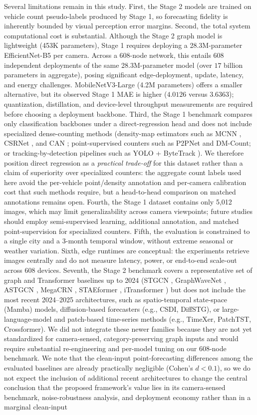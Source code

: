 \documentclass[a4paper,fleqn]{cas-sc}
\begin{document}
Several limitations remain in this study. First, the Stage 2 models are trained on vehicle count pseudo-labels produced by Stage 1, so forecasting fidelity is inherently bounded by visual perception error margins. Second, the total system computational cost is substantial. Although the Stage 2 graph model is lightweight (453K parameters), Stage 1 requires deploying a 28.3M-parameter EfficientNet-B5 per camera. Across a 608-node network, this entails 608 independent deployments of the same 28.3M-parameter model (over $17$ billion parameters in aggregate), posing significant edge-deployment, update, latency, and energy challenges. MobileNetV3-Large (4.2M parameters) offers a smaller alternative, but its observed Stage 1 MAE is higher ($4.0126$ versus $3.6363$); quantization, distillation, and device-level throughput measurements are required before choosing a deployment backbone. Third, the Stage 1 benchmark compares only classification backbones under a direct-regression head and does not include specialized dense-counting methods (density-map estimators such as MCNN \cite{mcnn}, CSRNet \cite{csrnet}, and CAN \cite{can}; point-supervised counters such as P2PNet and DM-Count; or tracking-by-detection pipelines such as YOLO + ByteTrack \cite{yolo}). We therefore position direct regression as a \emph{practical trade-off} for this dataset rather than a claim of superiority over specialized counters: the aggregate count labels used here avoid the per-vehicle point/density annotation and per-camera calibration cost that such methods require, but a head-to-head comparison on matched annotations remains open. Fourth, the Stage 1 dataset contains only 5,012 images, which may limit generalizability across camera viewpoints; future studies should employ semi-supervised learning, additional annotation, and matched point-supervision for specialized counters. Fifth, the evaluation is constrained to a single city and a 3-month temporal window, without extreme seasonal or weather variation. Sixth, edge runtimes are conceptual: the experiments retrieve images centrally and do not measure latency, power, or end-to-end scale-out across 608 devices. Seventh, the Stage 2 benchmark covers a representative set of graph and Transformer baselines up to 2024 (STGCN \cite{stgcn}, GraphWaveNet \cite{wavenet}, ASTGCN \cite{astgcn}, MegaCRN \cite{megacrn}, STAEformer \cite{staeformer}, iTransformer \cite{itransformer}) but does not include the most recent 2024--2025 architectures, such as spatio-temporal state-space (Mamba) models, diffusion-based forecasters (e.g., CSDI, DiffSTG), or large-language-model and patch-based time-series methods (e.g., TimeXer, PatchTST, Crossformer). We did not integrate these newer families because they are not yet standardized for camera-sensed, category-preserving graph inputs and would require substantial re-engineering and per-model tuning on our 608-node benchmark. We note that the clean-input point-forecasting differences among the evaluated baselines are already practically negligible (Cohen's $d < 0.1$), so we do not expect the inclusion of additional recent architectures to change the central conclusion that the proposed framework's value lies in its camera-sensed benchmark, noise-robustness analysis, and deployment economy rather than in a marginal clean-input 
\end{document}
